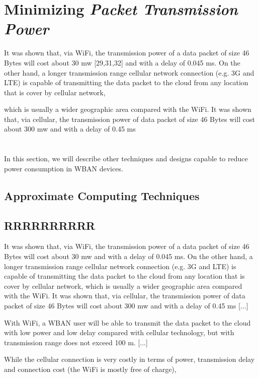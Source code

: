 \documentclass[sigchi]{acmart}
\begin{document}
\citet{MSAReport} 












\section{Minimizing \textit{Packet Transmission Power}}


It was shown that, via WiFi, the transmission power of a data packet of size 46 Bytes will cost about
30 mw [29,31,32] and with a delay of 0.045 ms. On the other hand, a longer transmission range cellular network connection
(e.g. 3G and LTE) is capable of transmitting the data packet to the cloud from any location that is cover by cellular network,

which is usually a wider geographic area compared with the WiFi. It was shown that, via cellular, the transmission power of
data packet of size 46 Bytes will cost about 300 mw and with a delay of 0.45 ms

\section{}

In this section, we will describe other techniques and designs capable to reduce power consumption in WBAN devices.

\subsection{Approximate Computing Techniques}




\subsection{RRRRRRRRRR}

\begin{quoting}[font=itshape, begintext={``}, endtext={''\cite[par.~3.1]{MSAReport}}]
It was shown that, via WiFi, the transmission power of a data packet of size 46 Bytes will cost about 30 mw and with a delay of 0.045 ms. On the other hand, a longer transmission range cellular network connection (e.g. 3G and LTE) is capable of transmitting the data packet to the cloud from any location that is cover by cellular network, which is usually a wider geographic area compared with the WiFi. It was shown that, via cellular, the transmission power of data packet of size 46 Bytes will cost about 300 mw and with a delay of 0.45 ms [...]


With WiFi, a WBAN user will be able to transmit the data packet to the cloud with low power and low delay compared with cellular technology, but with transmission range does not exceed 100 m. [...]


While the cellular connection is very costly in terms of power, transmission delay and connection cost (the WiFi is mostly free of charge),
\end{quoting}
\end{document}
